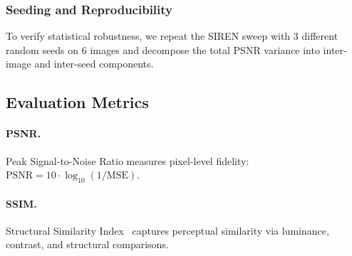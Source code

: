 \documentclass[a4paper,oneside,11pt,english]{scrartcl}
\begin{document}
\subsubsection{Seeding and Reproducibility}

To verify statistical robustness, we repeat the SIREN sweep with 3 different
random seeds on 6 images and decompose the total PSNR variance into
inter-image and inter-seed components.

\subsection{Evaluation Metrics}

\paragraph{PSNR.}
Peak Signal-to-Noise Ratio measures pixel-level fidelity:
$\text{PSNR} = 10 \cdot \log_{10}(1/\text{MSE})$.

\paragraph{SSIM.}
Structural Similarity Index~\cite{wang2004ssim} captures perceptual similarity
via luminance, contrast, and structural comparisons.
\end{document}

